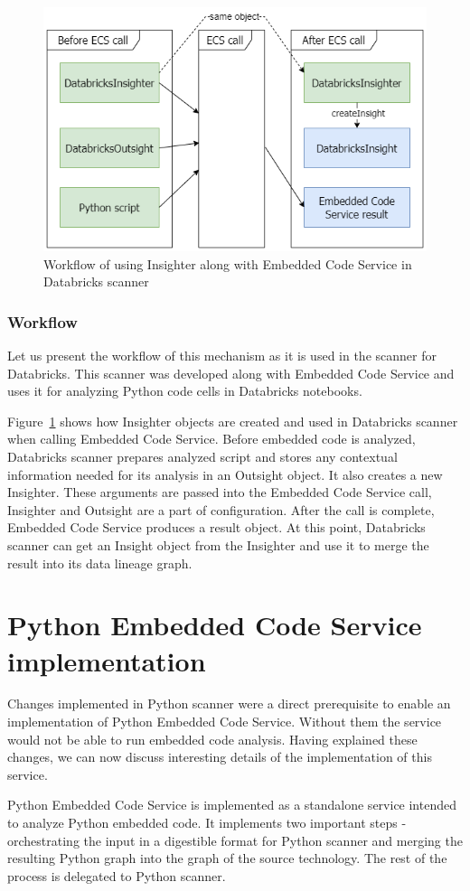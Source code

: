 \begin{figure}[ht]\centering
\includegraphics[width=1.0\textwidth]{img/insighter.png}
\caption{Workflow of using Insighter along with Embedded Code Service in Databricks scanner}
\label{fig:insighter}
\end{figure}

\subsubsection{Workflow}

Let us present the workflow of this mechanism as it is used in the scanner for Databricks. This scanner was developed along with Embedded Code Service and uses it for analyzing Python code cells in Databricks notebooks.
\par
Figure~\ref{fig:insighter} shows how Insighter objects are created and used in Databricks scanner when calling Embedded Code Service. Before embedded code is analyzed, Databricks scanner prepares analyzed script and stores any contextual information needed for its analysis in an Outsight object. It also creates a new Insighter. These arguments are passed into the Embedded Code Service call, Insighter and Outsight are a part of configuration. After the call is complete, Embedded Code Service produces a result object. At this point, Databricks scanner can get an Insight object from the Insighter and use it to merge the result into its data lineage graph.

\section{Python Embedded Code Service implementation}

Changes implemented in Python scanner were a direct prerequisite to enable an implementation of Python Embedded Code Service. Without them the service would not be able to run embedded code analysis. Having explained these changes, we can now discuss interesting details of the implementation of this service.
\par
Python Embedded Code Service is implemented as a standalone service intended to analyze Python embedded code. It implements two important steps - orchestrating the input in a digestible format for Python scanner and merging the resulting Python graph into the graph of the source technology. The rest of the process is delegated to Python scanner.

